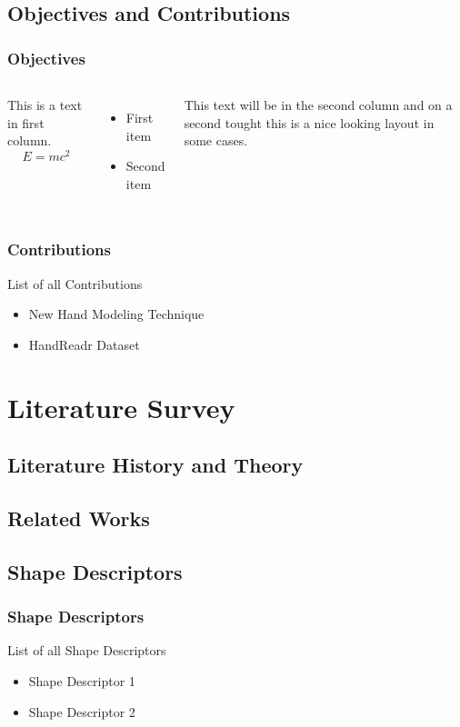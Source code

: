 \documentclass{beamer}
\begin{document}
\subsection{Objectives and Contributions}
\begin{frame}
\frametitle{Objectives}

\begin{columns}

This is a text in first column.
$$E=mc^2$$
\begin{itemize}
\item First item
\item Second item
\end{itemize}

This text will be in the second column
and on a second tought this is a nice looking
layout in some cases.
\end{columns}
\end{frame}
\begin{frame}
	\frametitle{Contributions}
	List of all Contributions
	
	\begin{itemize}
		\item<1-> New Hand Modeling Technique
		\item<2-> HandReadr Dataset
	\end{itemize}
\end{frame}

\section{Literature Survey}
\subsection{Literature History and Theory}
\subsection{Related Works}
\subsection{Shape Descriptors}
\begin{frame}
	\frametitle{Shape Descriptors}
	List of all Shape Descriptors
	
	\begin{itemize}
		\item<1-> Shape Descriptor 1
		\item<2-> Shape Descriptor 2
	\end{itemize}
\end{frame}
\end{document}
